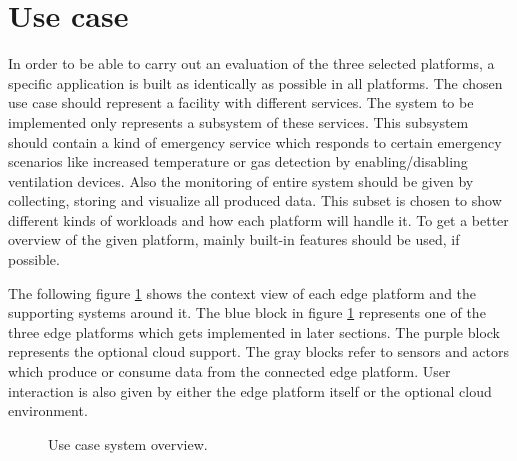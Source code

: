 \section{Use case}
In order to be able to carry out an evaluation of the three selected platforms, a specific application is built as identically as possible in all platforms. The chosen use case should represent a facility with different services. The system to be implemented only represents a subsystem of these services. This subsystem should contain a kind of emergency service which responds to certain emergency scenarios like increased temperature or gas detection by enabling/disabling ventilation devices. Also the monitoring of entire system should be given by collecting, storing and visualize all produced data. This subset is chosen to show different kinds of workloads and how each platform will handle it. To get a better overview of the given platform, mainly built-in features should be used, if possible.

\bigskip
The following figure \ref{fig:use-case-overview} shows the context view of each edge platform and the supporting systems around it. The blue block in figure \ref{fig:use-case-overview} represents one of the three edge platforms which gets implemented in later sections. The purple block represents the optional cloud support. The gray blocks refer to sensors and actors which produce or consume data from the connected edge platform. User interaction is also given by either the edge platform itself or the optional cloud environment.

\begin{figure}[H]
    \centering
    \fontsize{8}{10}\selectfont
    \def\svgwidth{\textwidth}
    
    \caption{Use case system overview.}
    \label{fig:use-case-overview}
\end{figure}

